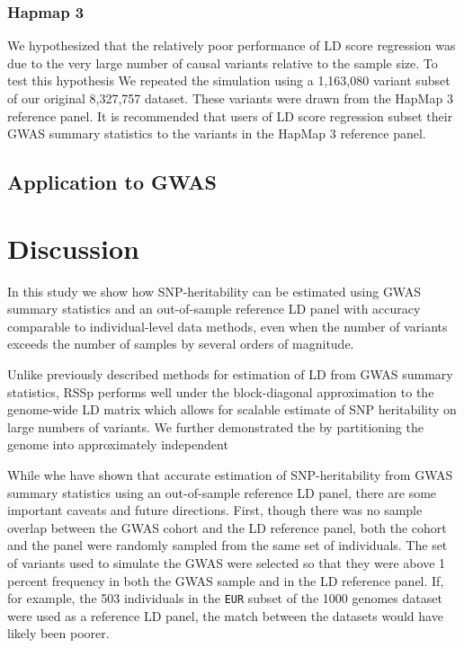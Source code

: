 \subsubsection{Hapmap 3}\label{sec:org0fa2c7f}

We hypothesized that the relatively poor performance of LD score regression was due to the very large number of causal variants relative to the sample size.  To test this hypothesis  We repeated the simulation using a 1,163,080 variant subset of our original 8,327,757 dataset.  These variants were drawn from the HapMap 3 reference panel\cite{hapmap3}.  It is recommended that users of LD score regression subset their GWAS summary statistics to the variants in the HapMap 3 reference panel\cite{ldsc}.  


\subsection{Application to GWAS}


\section{Discussion}\label{sec:orge95691e}


In this study we show how SNP-heritability can be estimated using GWAS summary statistics and an out-of-sample reference LD panel with accuracy comparable to individual-level data methods, even when the number of variants exceeds the number of samples by several orders of magnitude.

Unlike previously described methods for estimation of LD from GWAS summary statistics, RSSp performs well under the block-diagonal approximation to the genome-wide LD matrix which allows for scalable estimate of SNP heritability on large numbers of variants. We further demonstrated the by partitioning the genome into approximately independent

While whe have shown that accurate estimation of SNP-heritability from GWAS summary statistics using an out-of-sample reference LD panel, there are some important caveats and future directions.  First, though there was no sample overlap between the GWAS cohort and the LD reference panel, both the cohort and the panel were randomly sampled from the same set of individuals.  The set of
variants used to simulate the GWAS were selected so that they were above 1 percent frequency in both the GWAS sample and in the LD reference panel.  If, for example, the 503 individuals in the \texttt{EUR} subset of the 1000 genomes dataset were used as a reference LD panel, the match between the datasets would have likely been poorer.

